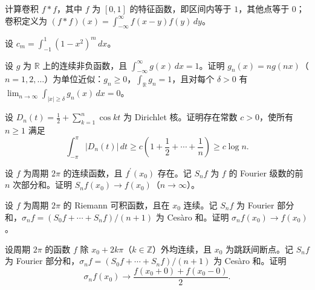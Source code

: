 \noindent\begin{minipage}{\textwidth}
计算卷积 $f*f$，其中 $f$ 为 $[0,1]$ 的特征函数，即区间内等于 $1$，其他点等于 $0$；卷积定义为 $(f*f)(x)=\int_{-\infty}^{\infty}f(x-y)f(y)\,dy$。
\end{minipage}\par\vfill
\newpage
\noindent\begin{minipage}{\textwidth}
设 $c_m=\int_{-1}^1(1-x^2)^m\,dx$。
\end{minipage}\par\vfill
\noindent\begin{minipage}{\textwidth}
设 $g$ 为 $\mathbb R$ 上的连续非负函数，且 $\int_{-\infty}^{\infty}g(x)\,dx=1$。证明 $g_n(x)=ng(nx)$（$n=1,2,\ldots$）为单位近似：$g_n\ge0$，$\int_{\mathbb R}g_n=1$，且对每个 $\delta>0$ 有 $\lim_{n\to\infty}\int_{|x|\ge\delta}g_n(x)\,dx=0$。
\end{minipage}\par\vfill
\noindent\begin{minipage}{\textwidth}
设 $D_n(t)=\frac12+\sum_{k=1}^n\cos kt$ 为 Dirichlet 核。证明存在常数 $c>0$，使所有 $n\ge1$ 满足\[\int_{-\pi}^{\pi}|D_n(t)|\,dt\ge c\left(1+\frac12+\cdots+\frac1n\right)\ge c\log n.\]
\end{minipage}\par\vfill
\noindent\begin{minipage}{\textwidth}
设 $f$ 为周期 $2\pi$ 的连续函数，且 $f^{\prime}(x_0)$ 存在。记 $S_nf$ 为 $f$ 的 Fourier 级数的前 $n$ 次部分和。证明 $S_nf(x_0)\to f(x_0)$（$n\to\infty$）。
\end{minipage}\par\vfill
\newpage
\noindent\begin{minipage}{\textwidth}
设 $f$ 为周期 $2\pi$ 的 Riemann 可积函数，且在 $x_0$ 连续。记 $S_nf$ 为 Fourier 部分和，$\sigma_nf=(S_0f+\cdots+S_nf)/(n+1)$ 为 Cesàro 和。证明 $\sigma_nf(x_0)\to f(x_0)$。
\end{minipage}\par\vfill
\noindent\begin{minipage}{\textwidth}
设周期 $2\pi$ 的函数 $f$ 除 $x_0+2k\pi$（$k\in\mathbb Z$）外均连续，且 $x_0$ 为跳跃间断点。记 $S_nf$ 为 Fourier 部分和，$\sigma_nf=(S_0f+\cdots+S_nf)/(n+1)$ 为 Cesàro 和。证明\[\sigma_nf(x_0)\longrightarrow\frac{f(x_0+0)+f(x_0-0)}2.\]
\end{minipage}\par\vfill
